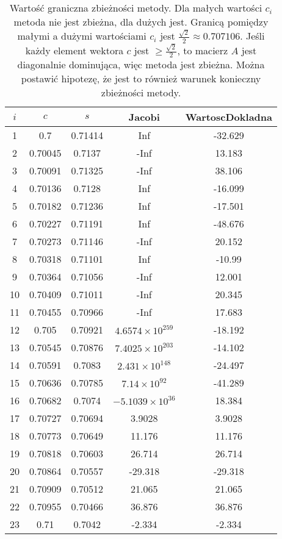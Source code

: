 \documentclass{article}
\begin{document}
	\begin{table}[h]
		\centering
		\begin{tabular}{|c|c|c|c|c|}
			\hline
			$i$ & $c$ & $s$ & Jacobi & WartoscDokladna \\
			\hline
			1 & 0.7 & 0.71414 & Inf & -32.629 \\
			2 & 0.70045 & 0.7137 & -Inf & 13.183 \\
			3 & 0.70091 & 0.71325 & -Inf & 38.106 \\
			4 & 0.70136 & 0.7128 & Inf & -16.099 \\
			5 & 0.70182 & 0.71236 & Inf & -17.501 \\
			6 & 0.70227 & 0.71191 & Inf & -48.676 \\
			7 & 0.70273 & 0.71146 & -Inf & 20.152 \\
			8 & 0.70318 & 0.71101 & Inf & -10.99 \\
			9 & 0.70364 & 0.71056 & -Inf & 12.001 \\
			10 & 0.70409 & 0.71011 & -Inf & 20.345 \\
			11 & 0.70455 & 0.70966 & -Inf & 17.683 \\
			12 & 0.705 & 0.70921 & $4.6574 \times 10^{259}$ & -18.192 \\
			13 & 0.70545 & 0.70876 & $7.4025 \times 10^{203}$ & -14.102 \\
			14 & 0.70591 & 0.7083 & $2.431 \times 10^{148}$ & -24.497 \\
			15 & 0.70636 & 0.70785 & $7.14 \times 10^{92}$ & -41.289 \\
			16 & 0.70682 & 0.7074 & $-5.1039 \times 10^{36}$ & 18.384 \\
			17 & 0.70727 & 0.70694 & 3.9028 & 3.9028 \\
			18 & 0.70773 & 0.70649 & 11.176 & 11.176 \\
			19 & 0.70818 & 0.70603 & 26.714 & 26.714 \\
			20 & 0.70864 & 0.70557 & -29.318 & -29.318 \\
			21 & 0.70909 & 0.70512 & 21.065 & 21.065 \\
			22 & 0.70955 & 0.70466 & 36.876 & 36.876 \\
			23 & 0.71 & 0.7042 & -2.334 & -2.334 \\
			\hline
		\end{tabular}
		\caption{Wartość graniczna zbieżności metody. Dla małych wartości $c_i$ metoda nie jest zbieżna, dla dużych jest. Granicą pomiędzy małymi a dużymi wartościami $c_i$ jest $\frac{\sqrt{2}}{2} \approx 0.707106$. Jeśli każdy element wektora $c$ jest $\ge \frac{\sqrt{2}}{2}$, to macierz $A$ jest diagonalnie dominująca, więc metoda jest zbieżna. Można postawić hipotezę, że jest to również warunek konieczny zbieżności metody.}
	\end{table}
\end{document}
